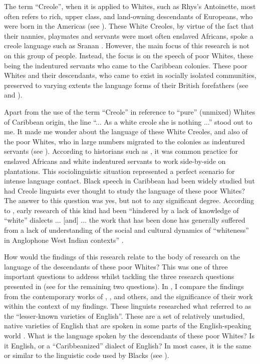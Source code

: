 The term ``Creole'', when it is applied to Whites, such as Rhys's Antoinette, most often refers to rich, upper class, and land-owning descendants of Europeans, who were born in the Americas (see \citealt{Cassidy82}). These White Creoles, by virtue of the fact that their nannies, playmates and servants were most often enslaved Africans, spoke a creole language such as Sranan \citep{Cassidy82}. However, the main focus of this research is not on this group of people. Instead, the focus is on the speech of poor Whites, these being the indentured servants who came to the Caribbean colonies. These poor Whites and their descendants, who came to exist in socially isolated communities, preserved to varying extents the language forms of their British forefathers (see \citealt{Aceto10} and \citealt{Williams03}).

Apart from the use of the term ``Creole'' in reference to ``pure'' (unmixed) Whites of Caribbean origin, the line ``... As a white creole she is nothing ...'' stood out to me. It made me wonder about the language of these White Creoles, and also of the poor Whites, who in large numbers migrated to the colonies as indentured servants (see ). According to historians such as \citet{Galenson02}, it was common practice for enslaved Africans and white indentured servants to work side-by-side on plantations. This sociolinguistic situation represented a perfect scenario for intense language contact. Black speech in Caribbean had been widely studied but had Creole linguists ever thought to study the language of these poor Whites? The answer to this question was yes, but not to any significant degree. According to \citet{Williams03}, early research of this kind had been ``hindered by a lack of knowledge of ``white'' dialects ... [and] ... the work that has been done has generally suffered from a lack of understanding of the social and cultural dynamics of ``whiteness'' in Anglophone West Indian contexts'' \citep[95]{Williams03}.

How would the findings of this research relate to the body of research on the language of the descendants of these poor Whites? This was one of three important questions to address whilst tackling the three research questions presented in  (see  for the remaining two questions). In , I compare the findings from the contemporary works of \citet{Aceto10}, \citet{Williams03}, \citet{Blake04} and others, and the significance of their work within the context of my findings. These linguists researched what \citet[30]{Trudgill02} referred to as the ``lesser-known varieties of English''. These are a set of relatively unstudied, native varieties of English that are spoken in some parts of the English-speaking world \citep{Trudgill02}. What is the language spoken by the descendants of these poor Whites? Is it English, or a ``Caribbeanized'' dialect of English? In most cases, it is the same or similar to the linguistic code used by Blacks (see \citealt{Cassidy82}).

